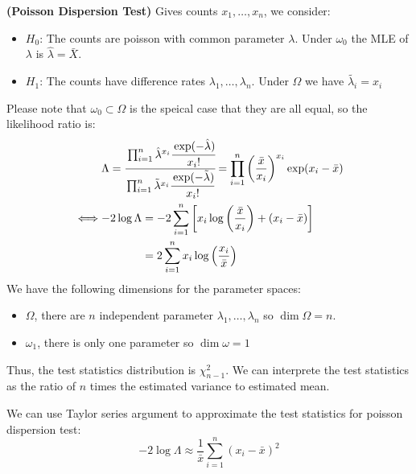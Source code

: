 \begin{example}{\textbf{(Poisson Dispersion Test)}}
    Gives counts $x_1,\dots,x_n$, we consider:
    \begin{itemize}
        \item $H_0$: The counts are poisson with common parameter $\lambda$. Under $\omega_0$ the MLE of $\lambda$ is $\hat{\lambda} = \bar{X}$. 
        \item $H_1$: The counts have difference rates $\lambda_1,\dots,\lambda_n$. Under $\Omega$ we have $\tilde{\lambda_i} = x_i$ 
    \end{itemize}
    Please note that $\omega_0 \subset\Omega$ is the speical case that they are all equal, so the likelihood ratio is:
    \begin{equation*}
    \begin{aligned}
        &\Lambda = \cfrac{\prod^n_{i=1}\hat{\lambda}^{x_i}\cfrac{\exp(-\hat{\lambda})}{x_i!}}{\prod^n_{i=1}\tilde{\lambda}^{x_i}\cfrac{\exp(-\tilde{\lambda})}{x_i!}} = \prod^n_{i=1}\left( \frac{\bar{x}}{x_i} \right)^{x_i}\exp(x_i-\bar{x}) \\
        \iff&\begin{aligned}[t]
            -2\log\Lambda &= -2\sum^n_{i=1}\left[ x_i\log\left( \frac{\bar{x}}{x_i} \right) + (x_i - \bar{x}) \right] \\
            &=2\sum^n_{i=1}x_i\log\left( \frac{x_i}{\bar{x}} \right)
        \end{aligned}
    \end{aligned}
    \end{equation*}
    We have the following dimensions for the parameter spaces:
    \begin{itemize}
        \item $\Omega$, there are $n$ independent parameter $\lambda_1,\dots,\lambda_n$ so $\dim\Omega=n$.
        \item $\omega_1$, there is only one parameter so $\dim\omega = 1$
    \end{itemize}
    Thus, the test statistics distribution is $\chi^2_{n-1}$. We can interprete the test statistics as the ratio of $n$ times the estimated variance to estimated mean. 
\end{example}
\begin{remark}
    We can use Taylor series argument to approximate the test statistics for poisson dispersion test:
    \begin{equation*}
        -2\log\Lambda \approx \frac{1}{\bar{x}}\sum^n_{i=1}(x_i - \bar{x})^2
    \end{equation*}
\end{remark}

